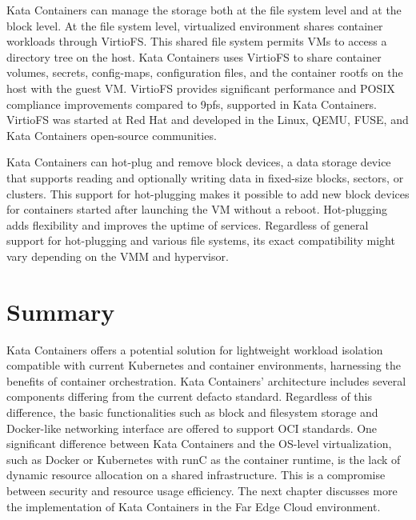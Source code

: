 Kata Containers can manage the storage both at the file system level and at the block level. At the file system level, virtualized environment shares container workloads through VirtioFS. This shared file system permits VMs to access a directory tree on the host. Kata Containers uses VirtioFS to share container volumes, secrets, config-maps, configuration files, and the container rootfs on the host with the guest VM. VirtioFS provides significant performance and POSIX compliance improvements compared to 9pfs, supported in Kata Containers. VirtioFS was started at Red Hat and developed in the Linux, QEMU, FUSE, and Kata Containers open-source communities. \cite{virtio-fs-Kata}\cite{virtio-fs}

Kata Containers can hot-plug and remove block devices, a data storage device that supports reading and optionally writing data in fixed-size blocks, sectors, or clusters. This support for hot-plugging makes it possible to add new block devices for containers started after launching the VM without a reboot. Hot-plugging adds flexibility and improves the uptime of services. Regardless of general support for hot-plugging and various file systems, its exact compatibility might vary depending on the VMM and hypervisor. \cite{KataContainersArchitecture}\cite{KataContainersVirtualization}

\section{Summary}

Kata Containers offers a potential solution for lightweight workload isolation compatible with current Kubernetes and container environments, harnessing the benefits of container orchestration. Kata Containers' architecture includes several components differing from the current defacto standard. Regardless of this difference, the basic functionalities such as block and filesystem storage and Docker-like networking interface are offered to support OCI standards. One significant difference between Kata Containers and the OS-level virtualization, such as Docker or Kubernetes with runC as the container runtime, is the lack of dynamic resource allocation on a shared infrastructure. This is a compromise between security and resource usage efficiency. The next chapter discusses more the implementation of Kata Containers in the Far Edge Cloud environment.